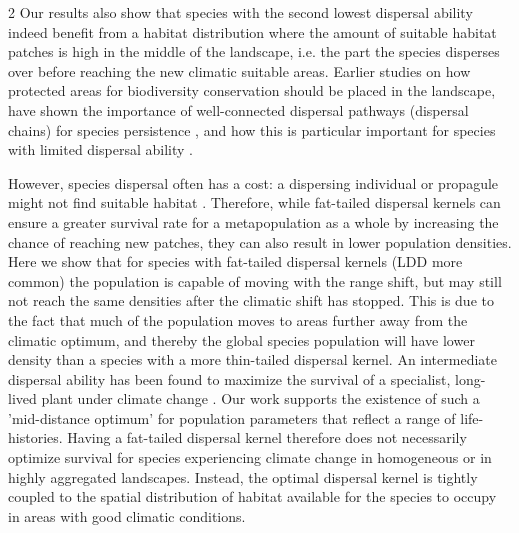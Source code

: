 \documentclass[12pt,pdftex]{article}
\begin{document}
\begin{spacing}{2}
Our results also show that species with the second lowest dispersal ability indeed benefit from a habitat distribution where the amount of suitable habitat patches is high in the middle of the landscape, i.e. the part the species disperses over before reaching the new climatic suitable areas. Earlier studies on how protected areas for biodiversity conservation should be placed in the landscape, have shown the importance of well-connected dispersal pathways (dispersal chains) for species persistence  \citep{Phillips2008}, and how this is particular important for species with limited dispersal ability \citep{Williams2005}. 

However, species dispersal often has a cost: a dispersing individual or propagule might not find suitable habitat \citep{Bonte2012}. Therefore, while fat-tailed dispersal kernels can ensure a greater survival rate for a metapopulation as a whole by increasing the chance of reaching new patches, they can also result in lower population densities. Here we show that for species with fat-tailed dispersal kernels (LDD more common) the population is capable of moving with the range shift, but may still not reach the same densities after the climatic shift has stopped. This is due to the fact that much of the population moves to areas further away from the climatic optimum, and thereby the global species population will have lower density than a species with a more thin-tailed dispersal kernel. An intermediate dispersal ability has been found to maximize the survival of a specialist, long-lived plant under climate change \citep{Perez-Garcia2017}. Our work supports the existence of such a 'mid-distance optimum' for population parameters that reflect a range of life-histories. Having a fat-tailed dispersal kernel therefore does not necessarily optimize survival for species experiencing climate change in homogeneous or in highly aggregated landscapes. Instead, the optimal dispersal kernel is tightly coupled to the spatial distribution of habitat available for the species to occupy in areas with good climatic conditions. 



\end{spacing}
\end{document}
